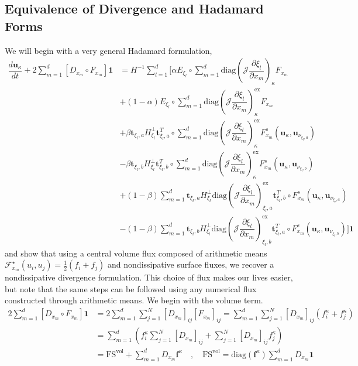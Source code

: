 \documentclass[12pt,a4paper]{article}
\newcommand{\pder}[2][]{\dfrac{\partial #1}{\partial #2}} %
\newcommand{\der}[2][]{\dfrac{d #1}{d #2}} %
\newcommand{\fn}[1]{\mathcal{#1}} %
\begin{document}
\subsection{Equivalence of Divergence and Hadamard Forms}

We will begin with a very general Hadamard formulation,
\begin{align*}
\der[\bm{u}_\kappa]{t} + 2 \sum_{m=1}^d \left[ D_{x_m} \circ F_{x_m} \right] \bm{1}  
&= H^{-1} \sum_{l=1}^d \Bigg[ \alpha E_{\xi_l} \circ \sum_{m=1}^d \text{diag} \left( \fn{J} \pder[\xi_l]{x_m} \right)_{\kappa} F_{x_m} \\
& + (1-\alpha) E_{\xi_l} \circ \sum_{m=1}^d \text{diag} \left( \fn{J} \pder[\xi_l]{x_m} \right)_{\kappa}^\text{ex} F_{x_m} \\
& + \beta \bm{t}_{\xi_l, a} H^{\bot}_{\xi_l} \bm{t}_{\xi_l, a}^T \circ \sum_{m=1}^d \text{diag} \left( \fn{J} \pder[\xi_l]{x_m} \right)_{\kappa}^\text{ex} F^s_{x_m} (\bm{u}_\kappa, \bm{u}_{\nu_{\xi_l,a}}) \\
&  -  \beta \bm{t}_{\xi_l, b} H^{\bot}_{\xi_l} \bm{t}_{\xi_l, b}^T \circ \sum_{m=1}^d \text{diag} \left( \fn{J} \pder[\xi_l]{x_m} \right)_{\kappa}^\text{ex} F^s_{x_m} (\bm{u}_\kappa, \bm{u}_{\nu_{\xi_l,b}}) \\
&  + (1- \beta) \sum_{m=1}^d \bm{t}_{\xi_l, a} H^{\bot}_{\xi_l} \text{diag} \left( \fn{J} \pder[\xi_l]{x_m} \right)_{\xi_l,a}^\text{ex} \bm{t}_{\xi_l, b}^T \circ  F^s_{x_m} (\bm{u}_\kappa, \bm{u}_{\nu_{\xi_l,a}}) \\
& - (1- \beta)\sum_{m=1}^d \bm{t}_{\xi_l, b} H^{\bot}_{\xi_l}  \text{diag} \left( \fn{J} \pder[\xi_l]{x_m} \right)_{\xi_l,b}^\text{ex} \bm{t}_{\xi_l, a}^T \circ F^s_{x_m} (\bm{u}_\kappa, \bm{u}_{\nu_{\xi_l,b}})
\Bigg] \bm{1}
\end{align*}
and show that using a central volume flux composed of arithmetic means $ \fn{F}^\star_{x_m} (u_i, u_j) = \frac{1}{2}(f_i + f_j) $ and nondissipative surface fluxes, we recover a nondissipative divergence formulation. This choice of flux makes our lives easier, but note that the same steps can be followed using any numerical flux constructed through arithmetic means. We begin with the volume term.
\begin{align*}
2 \sum_{m=1}^d \left[ D_{x_m} \circ F_{x_m} \right] \bm{1} &= 2 \sum_{m=1}^d \sum_{j=1}^N [D_{x_m}]_{ij} [ F_{x_m} ]_{ij} = \sum_{m=1}^d \sum_{j=1}^N [D_{x_m}]_{ij} (f_i^\kappa + f_j^\kappa) \\
& =  \sum_{m=1}^d \left( f_i^\kappa \sum_{j=1}^N [D_{x_m}]_{ij} + \sum_{j=1}^N [D_{x_m}]_{ij} f_j^\kappa \right)  \\
& = \text{FS}^{\text{vol}} + \sum_{m=1}^d D_{x_m} \bm{f}^\kappa \quad , \quad \text{FS}^{\text{vol}} =  \text{diag}(\bm{f}^\kappa) \sum_{m=1}^d D_{x_m} \bm{1}
\end{align*}
\end{document}

